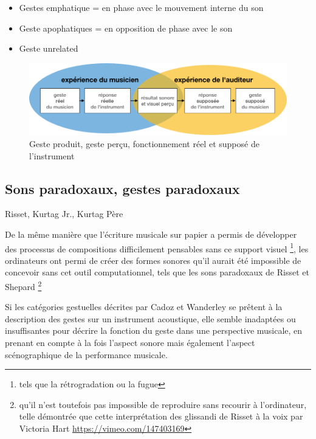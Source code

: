 \vspace{-1em}
\begin{itemize}[noitemsep]
\item Gestes emphatique = en phase avec le mouvement interne du son
\item Geste apophatiques = en opposition de phase avec le son
\item Geste unrelated
\end{itemize}

\begin{figure}[!htbp]
	\captionsetup{format=plain}%
	\includegraphics[width=\textwidth]{gfx/03_gesture/gesteReelGesteSuppose.jpg}
	\caption{Geste produit, geste perçu, fonctionnement réel et supposé de l'instrument}
	\label{fig:gesture:RealVsSupposed}
\end{figure}


\subsection{Sons paradoxaux, gestes paradoxaux}
Risset, Kurtag Jr., Kurtag Père

De la même manière que l'écriture musicale sur papier a permis de développer des processus de compositions difficilement pensables sans ce support visuel \footnote{tels que la rétrogradation ou la fugue}, les ordinateurs ont permi de créer des formes sonores qu'il aurait été impossible de concevoir sans cet outil computationnel, tels que les sons paradoxaux de Risset et Shepard \footnote{qu'il n'est toutefois pas impossible de reproduire sans recourir à l'ordinateur, telle démontrée que cette interprétation des glissandi de Risset à la voix par Victoria Hart \url{https://vimeo.com/147403169}}

Si les catégories gestuelles décrites par Cadoz et Wanderley se prêtent à la description des gestes sur un instrument acoustique, elle semble inadaptées ou insuffisantes pour décrire la fonction du geste dans une perspective musicale, en prenant en compte à la fois l'aspect sonore mais également l'aspect scénographique de la performance musicale.

